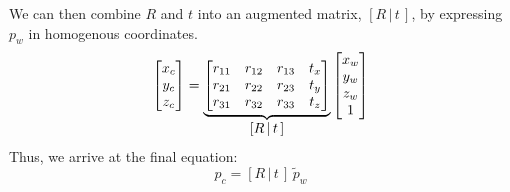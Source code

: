 We can then combine $R$ and $t$ into an augmented matrix, $[R\,|\,t\,]$, by expressing $p_w$ in homogenous coordinates.
\begin{equation}
    \begin{bmatrix}
        x_c \\ y_c \\ z_c
    \end{bmatrix}
    =
    \underbrace{
        \begin{bmatrix}
            r_{11} & r_{12} & r_{13} & t_x \\
            r_{21} & r_{22} & r_{23} & t_y \\
            r_{31} & r_{32} & r_{33} & t_z \\
        \end{bmatrix}
    }_{\mathlarger{[R\,|\,t\,]}}
    \begin{bmatrix}
        x_w \\ y_w \\ z_w \\ 1
    \end{bmatrix}
\end{equation}
Thus, we arrive at the final equation:
\begin{equation}
    p_c=[R\,|\,t\,] \,\widetilde{p}_w \label{eq:pc}
\end{equation}

